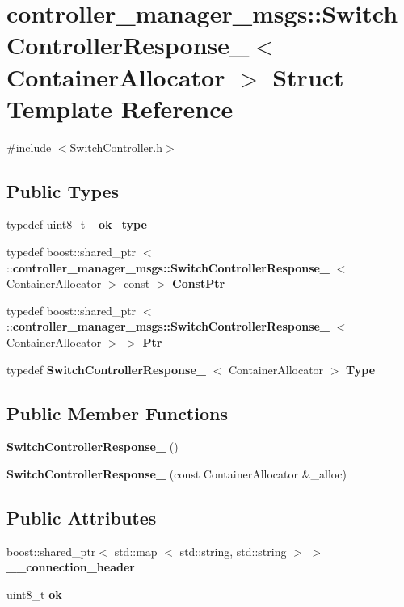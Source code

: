 \section{controller\-\_\-manager\-\_\-msgs\-:\-:\-Switch\-Controller\-Response\-\_\-$<$ \-Container\-Allocator $>$ \-Struct \-Template \-Reference}
\label{structcontroller__manager__msgs_1_1SwitchControllerResponse__}


{\ttfamily \#include $<$\-Switch\-Controller.\-h$>$}

\subsection*{\-Public \-Types}
\begin{DoxyCompactItemize}
\item 
typedef uint8\-\_\-t {\bf \-\_\-ok\-\_\-type}
\item 
typedef boost\-::shared\-\_\-ptr\*
$<$ \-::{\bf controller\-\_\-manager\-\_\-msgs\-::\-Switch\-Controller\-Response\-\_\-}\*
$<$ \-Container\-Allocator $>$ const  $>$ {\bf \-Const\-Ptr}
\item 
typedef boost\-::shared\-\_\-ptr\*
$<$ \-::{\bf controller\-\_\-manager\-\_\-msgs\-::\-Switch\-Controller\-Response\-\_\-}\*
$<$ \-Container\-Allocator $>$ $>$ {\bf \-Ptr}
\item 
typedef \*
{\bf \-Switch\-Controller\-Response\-\_\-}\*
$<$ \-Container\-Allocator $>$ {\bf \-Type}
\end{DoxyCompactItemize}
\subsection*{\-Public \-Member \-Functions}
\begin{DoxyCompactItemize}
\item 
{\bf \-Switch\-Controller\-Response\-\_\-} ()
\item 
{\bf \-Switch\-Controller\-Response\-\_\-} (const \-Container\-Allocator \&\-\_\-alloc)
\end{DoxyCompactItemize}
\subsection*{\-Public \-Attributes}
\begin{DoxyCompactItemize}
\item 
boost\-::shared\-\_\-ptr$<$ std\-::map\*
$<$ std\-::string, std\-::string $>$ $>$ {\bf \-\_\-\-\_\-connection\-\_\-header}
\item 
uint8\-\_\-t {\bf ok}
\end{DoxyCompactItemize}


